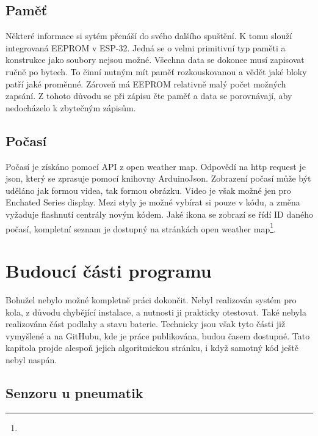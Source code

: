 \documentclass[a4paper,oneside,12pt]{report}
\begin{document}
\section{Paměť}

Některé informace si sytém přenáší do svého dalšího spuštění.
K tomu slouží integrovaná EEPROM v ESP-32.
Jedná se o velmi primitivní typ paměti a konstrukce jako soubory nejsou možné.
Všechna data se dokonce musí zapisovat ručně po bytech.
To činní nutným mít paměť rozkouskovanou a vědět jaké bloky patří jaké proměnné.
Zároveň má EEPROM relativně malý počet možných zapsání.
Z tohoto důvodu se při zápisu čte paměť a data se porovnávají, aby nedocházelo k zbytečným zápisům.

\section{Počasí}

Počasí je získáno pomocí API z open weather map.
Odpovědí na http request je json, který se zprasuje pomocí knihovny ArduinoJson.
Zobrazení počasí může být uděláno jak formou videa, tak formou obrázku.
Video je však možné jen pro Enchated Series display.
Mezi styly je možné vybírat si pouze v kódu, a změna vyžaduje flashnutí centrály novým kódem.
Jaké ikona se zobrazí se řídí ID daného počasí, kompletní seznam je dostupný na stránkách open weather map\footnote{}.

\chapter{Budoucí části programu}

Bohužel nebylo možné kompletně práci dokončit.
Nebyl realizován systém pro kola, z důvodu chybějící instalace, a nutnosti ji prakticky otestovat.
Také nebyla realizována část podlahy a stavu baterie.
Technicky jsou však tyto části již vymyšlené a na GitHubu, kde je práce publikována, budou časem dostupné.
Tato kapitola projde alespoň jejich algoritmickou stránku, i když samotný kód ještě nebyl naspán.

\section{Senzoru u pneumatik}
\end{document}
